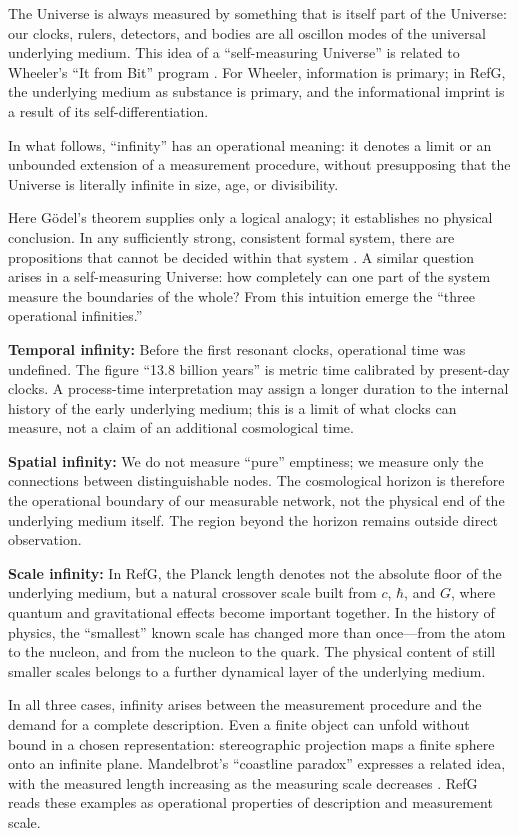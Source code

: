 \documentclass[11pt,a4paper]{article}
\begin{document}
The Universe is always measured by something that is itself part of the Universe: our clocks, rulers, detectors, and bodies are all oscillon modes of the universal underlying medium. This idea of a ``self-measuring Universe'' is related to Wheeler's ``It from Bit'' program \citep{wheeler1990}. For Wheeler, information is primary; in RefG, the underlying medium as substance is primary, and the informational imprint is a result of its self-differentiation.

In what follows, ``infinity'' has an operational meaning: it denotes a limit or an unbounded extension of a measurement procedure, without presupposing that the Universe is literally infinite in size, age, or divisibility.

Here Gödel's theorem supplies only a logical analogy; it establishes no physical conclusion. In any sufficiently strong, consistent formal system, there are propositions that cannot be decided within that system \citep{godel1931}. A similar question arises in a self-measuring Universe: how completely can one part of the system measure the boundaries of the whole? From this intuition emerge the ``three operational infinities.''

\textbf{Temporal infinity:} Before the first resonant clocks, operational time was undefined. The figure ``13.8 billion years'' is metric time calibrated by present-day clocks. A process-time interpretation may assign a longer duration to the internal history of the early underlying medium; this is a limit of what clocks can measure, not a claim of an additional cosmological time.

\textbf{Spatial infinity:} We do not measure ``pure'' emptiness; we measure only the connections between distinguishable nodes. The cosmological horizon is therefore the operational boundary of our measurable network, not the physical end of the underlying medium itself. The region beyond the horizon remains outside direct observation.

\textbf{Scale infinity:} In RefG, the Planck length denotes not the absolute floor of the underlying medium, but a natural crossover scale built from $c$, $\hbar$, and $G$, where quantum and gravitational effects become important together. In the history of physics, the ``smallest'' known scale has changed more than once---from the atom to the nucleon, and from the nucleon to the quark. The physical content of still smaller scales belongs to a further dynamical layer of the underlying medium.

In all three cases, infinity arises between the measurement procedure and the demand for a complete description. Even a finite object can unfold without bound in a chosen representation: stereographic projection maps a finite sphere onto an infinite plane. Mandelbrot's ``coastline paradox'' expresses a related idea, with the measured length increasing as the measuring scale decreases \citep{mandelbrot1982}. RefG reads these examples as operational properties of description and measurement scale.
\end{document}
